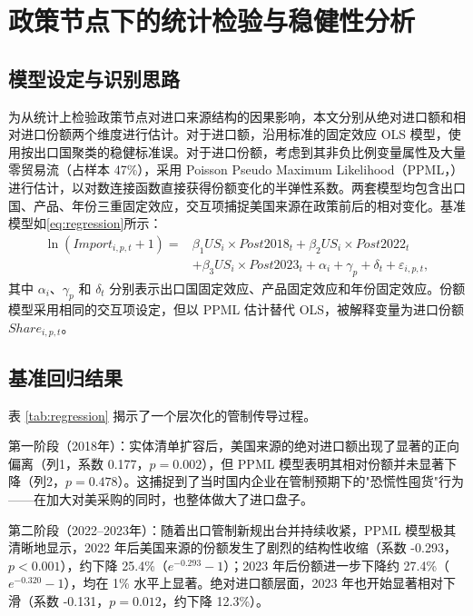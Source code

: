 \section{政策节点下的统计检验与稳健性分析}

\subsection{模型设定与识别思路}

为从统计上检验政策节点对进口来源结构的因果影响，本文分别从绝对进口额和相对进口份额两个维度进行估计。对于进口额，沿用标准的固定效应 OLS 模型，使用按出口国聚类的稳健标准误。对于进口份额，考虑到其非负比例变量属性及大量零贸易流（占样本 47\%），采用 Poisson Pseudo Maximum Likelihood（PPML，\citet{silva_tenreyro_2006}）进行估计，以对数连接函数直接获得份额变化的半弹性系数。两套模型均包含出口国、产品、年份三重固定效应，交互项捕捉美国来源在政策前后的相对变化。基准模型如\eqref{eq:regression}所示：
\begin{equation}
\begin{aligned}
\ln(Import_{i,p,t}+1)=&
\beta_1US_i\times Post2018_t+\beta_2US_i\times Post2022_t \\
&+\beta_3US_i\times Post2023_t+\alpha_i+\gamma_p+\delta_t+\varepsilon_{i,p,t},
\end{aligned}
\label{eq:regression}
\end{equation}
其中 $\alpha_i$、$\gamma_p$ 和 $\delta_t$ 分别表示出口国固定效应、产品固定效应和年份固定效应。份额模型采用相同的交互项设定，但以 PPML 估计替代 OLS，被解释变量为进口份额 $Share_{i,p,t}$。

\subsection{基准回归结果}



表 \ref{tab:regression} 揭示了一个层次化的管制传导过程。

第一阶段（2018年）：实体清单扩容后，美国来源的绝对进口额出现了显著的正向偏离（列1，系数 0.177，$p=0.002$），但 PPML 模型表明其相对份额并未显著下降（列2，$p=0.478$）。这捕捉到了当时国内企业在管制预期下的"恐慌性囤货"行为——在加大对美采购的同时，也整体做大了进口盘子。

第二阶段（2022--2023年）：随着出口管制新规出台并持续收紧，PPML 模型极其清晰地显示，2022 年后美国来源的份额发生了剧烈的结构性收缩（系数 -0.293，$p<0.001$），约下降 25.4\%（$e^{-0.293}-1$）；2023 年后份额进一步下降约 27.4\%（$e^{-0.320}-1$），均在 1\% 水平上显著。绝对进口额层面，2023 年也开始显著相对下滑（系数 -0.131，$p=0.012$，约下降 12.3\%）。

